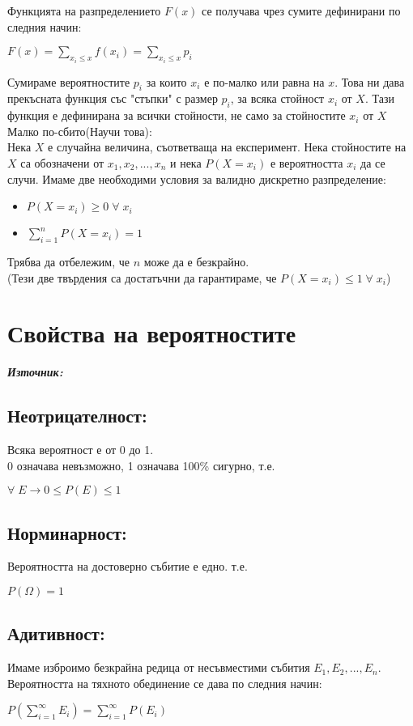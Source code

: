 \documentclass[11pt]{article} %
\newcommand{\italicBold}[1]{\textbf{\emph{#1}}}
\newcommand{\source}{\italicBold{Източник: }}
\begin{document}
Функцията на разпределението $F(x)$ се получава чрез сумите дефинирани по следния начин:\\
\centerline{$F(x)=\displaystyle \sum_{x_{i} \leq x}f(x_{i})=\sum_{x_{i}\leq x}p_{i}$}
Сумираме вероятностите $p_{i}$ за които $x_{i}$ е по-малко или равна на $x$. Това ни дава прекъсната функция със "стъпки" с размер $p_{i}$, за всяка стойност $x_{i}$ от $X$. Тази функция е дефинирана за всички стойности, не само за стойностите $x_{i}$ от $X$\\

Малко по-сбито(Научи това):\\
Нека $X$ е случайна величина, съответваща на експеримент. Нека стойностите на $X$ са обозначени от $x_{1}, x_{2},...,x_{n}$ и нека $P(X=x_{i})$ е вероятността $x_{i}$ да се случи. Имаме две необходими условия за валидно дискретно разпределение:\\
\begin{itemize}
	\item $P(X = x_{i}) \geq 0 \; \forall \; x_{i}$\\
	\item $\displaystyle \sum_{i=1}^{n}P(X=x_{i})=1$\\
\end{itemize}
Трябва да отбележим, че $n$ може да е безкрайно.\\
(Тези две твърдения са достатъчни да гарантираме, че $P(X=x_{i})\leq 1 \; \forall \; x_{i}$)

\section{Свойства на вероятностите}
\source {}

\subsection{Неотрицателност:} 
Всяка вероятност е от 0 до 1.\\
0 означава невъзможно, 1 означава 100\% сигурно, т.е.\\
\centerline{$\forall \; E \to 0 \leq P(E) \leq 1$}

\subsection{Норминарност:}
Вероятността на достоверно събитие е едно. т.е.\\
\centerline{$P(\Omega) = 1$}

\subsection{Адитивност:}
Имаме изброимо безкрайна редица от несъвместими събития $E_{1}, E_{2},...,E_{n}$. Вероятността на тяхното обединение се дава по следния начин:\\
\centerline{$P\displaystyle(\sum_{i=1}^{\infty}E_{i})=\sum_{i=1}^{\infty}P(E_{i})$}
\end{document}

